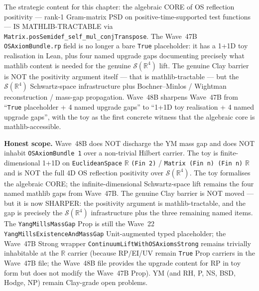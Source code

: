 \begin{remark}
The strategic content for this chapter: the algebraic CORE of OS reflection positivity --- rank-1 Gram-matrix PSD on positive-time-supported test functions --- IS MATHLIB-TRACTABLE via \texttt{Matrix.posSemidef\_self\_mul\_conjTranspose}. The Wave~47B \texttt{OSAxiomBundle.rp} field is no longer a bare \texttt{True} placeholder: it has a 1+1D toy realisation in Lean, plus four named upgrade gaps documenting precisely what mathlib content is needed for the genuine $\mathcal{S}(\mathbb{R}^4)$ lift. The genuine Clay barrier is NOT the positivity argument itself --- that is mathlib-tractable --- but the $\mathcal{S}(\mathbb{R}^4)$ Schwartz-space infrastructure plus Bochner--Minlos / Wightman reconstruction / mass-gap propagation. Wave~48B sharpens Wave~47B from ``\texttt{True} placeholder + 4 named upgrade gaps'' to ``1+1D toy realisation + 4 named upgrade gaps'', with the toy as the first concrete witness that the algebraic core is mathlib-accessible.

\textbf{Honest scope.} Wave~48B does NOT discharge the YM mass gap and does NOT inhabit \texttt{OSAxiomBundle 1} over a non-trivial Hilbert carrier. The toy is finite-dimensional 1+1D on \texttt{EuclideanSpace} $\mathbb{R}$ \texttt{(Fin 2)} / \texttt{Matrix (Fin n) (Fin n)} $\mathbb{R}$ and is NOT the full 4D OS reflection positivity over $\mathcal{S}(\mathbb{R}^4)$. The toy formalises the algebraic CORE; the infinite-dimensional Schwartz-space lift remains the four named mathlib gaps from Wave~47B. The genuine Clay barrier is NOT moved --- but it is now SHARPER: the positivity argument is mathlib-tractable, and the gap is precisely the $\mathcal{S}(\mathbb{R}^4)$ infrastructure plus the three remaining named items. The \texttt{YangMillsMassGap} Prop is still the Wave~22 \texttt{YangMillsExistenceAndMassGap} Unit-augmented typed placeholder; the Wave~47B Strong wrapper \texttt{ContinuumLiftWithOSAxiomsStrong} remains trivially inhabitable at the $\mathbb{R}$ carrier (because RP/EI/UV remain \texttt{True} Prop carriers in the Wave~47B file; the Wave~48B file provides the upgrade content for RP in toy form but does not modify the Wave~47B Prop). YM (and RH, P, NS, BSD, Hodge, NP) remain Clay-grade open problems.
\end{remark}


